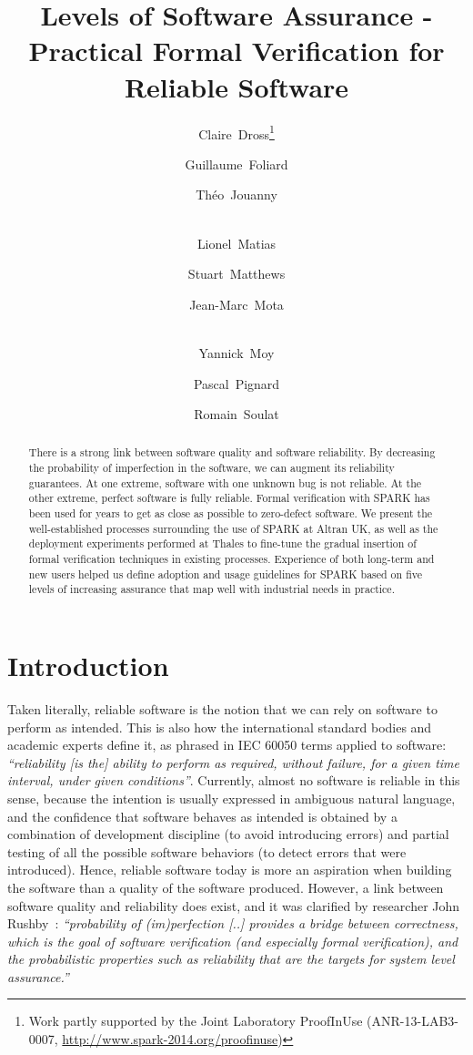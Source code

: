 \documentclass{llncs}
\title{Levels of Software Assurance - Practical Formal Verification for
  Reliable Software}
\author{Claire~Dross\inst{1}\thanks{Work partly supported by the Joint Laboratory
    ProofInUse (ANR-13-LAB3-0007, \url{http://www.spark-2014.org/proofinuse})}
  \and Guillaume~Foliard\inst{2} \and
  Théo~Jouanny\inst{3} \and \\ Lionel~Matias\inst{2} \and
  Stuart~Matthews\inst{4} \and Jean-Marc~Mota\inst{5} \and \\ 
  Yannick~Moy\inst{1} \and Pascal~Pignard\inst{3} \and Romain~Soulat\inst{5}}
\institute{AdaCore, F-75009 Paris \and Thales Air Systems, F-91470 Limours \and
  Thales Communications \& Security, F-49300 Cholet \and Altran, Bath BA1 1AN,
  United Kingdom \and Thales Research \& Technologies, F-91767 Palaiseau}
\date{}
\begin{document}
\sloppy
{}
\maketitle

\begin{abstract}
There is a strong link between software quality and software reliability. By
decreasing the probability of imperfection in the software, we can augment its
reliability guarantees. At one extreme, software with one unknown bug is not
reliable. At the other extreme, perfect software is fully reliable. Formal
verification with SPARK has been used for years to get as close as possible to
zero-defect software. We present the well-established processes surrounding the
use of SPARK at Altran UK, as well as the deployment experiments performed at
Thales to fine-tune the gradual insertion of formal verification techniques in
existing processes.  Experience of both long-term and new users helped us
define adoption and usage guidelines for SPARK based on five levels of
increasing assurance that map well with industrial needs in practice.
\end{abstract}


\section{Introduction}

Taken literally, reliable software is the notion that we can rely on software
to perform as intended. This is also how the international standard bodies and
academic experts define it, as phrased in IEC 60050 terms applied to software:
\textit{``reliability [is the] ability to perform as required, without failure,
  for a given time interval, under given conditions''}. Currently, almost no
software is reliable in this sense, because the intention is usually expressed
in ambiguous natural language, and the confidence that software behaves as
intended is obtained by a combination of development discipline (to avoid
introducing errors) and partial testing of all the possible software behaviors
(to detect errors that were introduced). Hence, reliable software today is more
an aspiration when building the software than a quality of the software
produced.  However, a link between software quality and reliability does exist,
and it was clarified by researcher John Rushby~\cite{RushbySEFM2009}:
\textit{``probability of (im)perfection [..]  provides a bridge between
  correctness, which is the goal of software verification (and especially
  formal verification), and the probabilistic properties such as reliability
  that are the targets for system level assurance.''}
\end{document}
